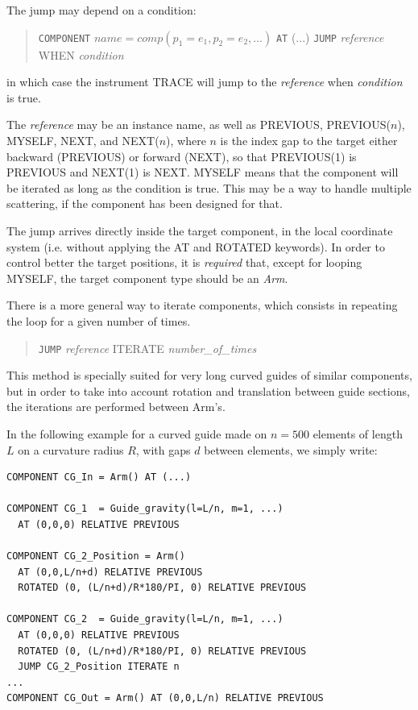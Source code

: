 The jump may depend on a condition:
\begin{quote}
  \texttt{COMPONENT} $\textit{name} = \textit{comp}(p_1 = e_1, p_2 = e_2, \ldots)$
  \texttt{AT} (...)
  \texttt{JUMP} {\it reference} WHEN {\it condition}
\end{quote}
in which case the instrument TRACE will jump to the {\it reference} when {\it
  condition} is true.

The {\it reference} may be an instance name, as well as PREVIOUS, PREVIOUS($n$),
MYSELF, NEXT, and NEXT($n$), where $n$ is the index gap to the target either
backward (PREVIOUS) or forward (NEXT), so that PREVIOUS(1) is PREVIOUS and
NEXT(1) is NEXT. MYSELF means that the component will be iterated as long as the
condition is true. This may be a way to handle multiple scattering, if the
component has been designed for that.

The jump arrives directly inside the target component, in the local coordinate
system (i.e. without applying the AT and ROTATED keywords). In order to control
better the target positions, it is \emph{required} that, except for looping
MYSELF, the target component type should be an \emph{Arm}.

There is a more general way to iterate components, which consists in repeating
the loop for a given number of times.
\begin{quote}
  \texttt{JUMP} {\it reference} ITERATE {\it number\_of\_times}
\end{quote}
This method is specially suited for very long curved guides of similar
components, but in order to take into account rotation and translation between
guide sections, the iterations are performed between Arm's.

In the following example for a curved guide made on $n=500$ elements of length
$L$ on a curvature radius $R$, with gaps $d$ between elements, we simply write:
\begin{verbatim}
COMPONENT CG_In = Arm() AT (...)

COMPONENT CG_1  = Guide_gravity(l=L/n, m=1, ...)
  AT (0,0,0) RELATIVE PREVIOUS

COMPONENT CG_2_Position = Arm()
  AT (0,0,L/n+d) RELATIVE PREVIOUS
  ROTATED (0, (L/n+d)/R*180/PI, 0) RELATIVE PREVIOUS

COMPONENT CG_2  = Guide_gravity(l=L/n, m=1, ...)
  AT (0,0,0) RELATIVE PREVIOUS
  ROTATED (0, (L/n+d)/R*180/PI, 0) RELATIVE PREVIOUS
  JUMP CG_2_Position ITERATE n
...
COMPONENT CG_Out = Arm() AT (0,0,L/n) RELATIVE PREVIOUS
\end{verbatim}

